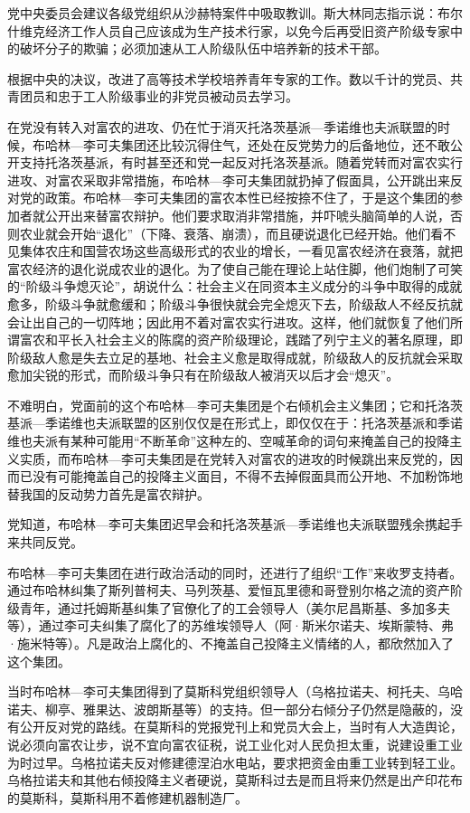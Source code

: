 党中央委员会建议各级党组织从沙赫特案件中吸取教训。斯大林同志指示说：布尔什维克经济工作人员自己应该成为生产技术行家，以免今后再受旧资产阶级专家中的破坏分子的欺骗；必须加速从工人阶级队伍中培养新的技术干部。

根据中央的决议，改进了高等技术学校培养青年专家的工作。数以千计的党员、共青团员和忠于工人阶级事业的非党员被动员去学习。

在党没有转入对富农的进攻、仍在忙于消灭托洛茨基派—季诺维也夫派联盟的时候，布哈林—李可夫集团还比较沉得住气，还处在反党势力的后备地位，还不敢公开支持托洛茨基派，有时甚至还和党一起反对托洛茨基派。随着党转而对富农实行进攻、对富农采取非常措施，布哈林—李可夫集团就扔掉了假面具，公开跳出来反对党的政策。布哈林—李可夫集团的富农本性已经按捺不住了，于是这个集团的参加者就公开出来替富农辩护。他们要求取消非常措施，并吓唬头脑简单的人说，否则农业就会开始“退化”（下降、衰落、崩溃），而且硬说退化已经开始。他们看不见集体农庄和国营农场这些高级形式的农业的增长，一看见富农经济在衰落，就把富农经济的退化说成农业的退化。为了使自己能在理论上站住脚，他们炮制了可笑的“阶级斗争熄灭论”，胡说什么：社会主义在同资本主义成分的斗争中取得的成就愈多，阶级斗争就愈缓和；阶级斗争很快就会完全熄灭下去，阶级敌人不经反抗就会让出自己的一切阵地；因此用不着对富农实行进攻。这样，他们就恢复了他们所谓富农和平长入社会主义的陈腐的资产阶级理论，践踏了列宁主义的著名原理，即阶级敌人愈是失去立足的基地、社会主义愈是取得成就，阶级敌人的反抗就会采取愈加尖锐的形式，而阶级斗争只有在阶级敌人被消灭以后才会“熄灭”。

不难明白，党面前的这个布哈林—李可夫集团是个右倾机会主义集团；它和托洛茨基派—季诺维也夫派联盟的区别仅仅是在形式上，即仅仅在于：托洛茨基派和季诺维也夫派有某种可能用“不断革命”这种左的、空喊革命的词句来掩盖自己的投降主义实质，而布哈林—李可夫集团是在党转入对富农的进攻的时候跳出来反党的，因而已没有可能掩盖自己的投降主义面目，不得不去掉假面具而公开地、不加粉饰地替我国的反动势力首先是富农辩护。

党知道，布哈林—李可夫集团迟早会和托洛茨基派—季诺维也夫派联盟残余携起手来共同反党。

布哈林—李可夫集团在进行政治活动的同时，还进行了组织“工作”来收罗支持者。通过布哈林纠集了斯列普柯夫、马列茨基、爱恒瓦里德和哥登别尔格之流的资产阶级青年，通过托姆斯基纠集了官僚化了的工会领导人（美尔尼昌斯基、多加多夫等），通过李可夫纠集了腐化了的苏维埃领导人（阿·斯米尔诺夫、埃斯蒙特、弗·施米特等）。凡是政治上腐化的、不掩盖自己投降主义情绪的人，都欣然加入了这个集团。

当时布哈林—李可夫集团得到了莫斯科党组织领导人（乌格拉诺夫、柯托夫、乌哈诺夫、柳亭、雅果达、波朗斯基等）的支持。但一部分右倾分子仍然是隐蔽的，没有公开反对党的路线。在莫斯科的党报党刊上和党员大会上，当时有人大造舆论，说必须向富农让步，说不宜向富农征税，说工业化对人民负担太重，说建设重工业为时过早。乌格拉诺夫反对修建德涅泊水电站，要求把资金由重工业转到轻工业。乌格拉诺夫和其他右倾投降主义者硬说，莫斯科过去是而且将来仍然是出产印花布的莫斯科，莫斯科用不着修建机器制造厂。

